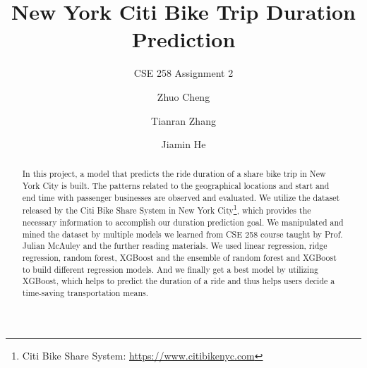 \documentclass[sigconf]{acmart}
\begin{document}
\title{New York Citi Bike Trip Duration Prediction}
\subtitle{CSE 258 Assignment 2}



\author{Zhuo Cheng}

\author{Tianran Zhang}


\author{Jiamin He}




\begin{abstract}
  In this project, a model that predicts the ride duration of a share bike trip in New York City is built. The patterns related to the geographical locations and start and end time with passenger businesses are observed and evaluated. We utilize the dataset released by the Citi Bike Share System in New York City\footnote{Citi Bike Share System:
\url{https://www.citibikenyc.com}}, which provides the necessary information to accomplish our duration prediction goal. We manipulated and mined the dataset by multiple models we learned from CSE 258 course taught by Prof. Julian McAuley and the further reading materials. We used linear regression, ridge regression, random forest, XGBoost and the ensemble of random forest and XGBoost to build different regression models. And we finally get a best model by utilizing XGBoost, which helps to predict the duration of a ride and thus helps users decide a time-saving transportation means. 

\end{abstract}




\maketitle




 
\end{document}
